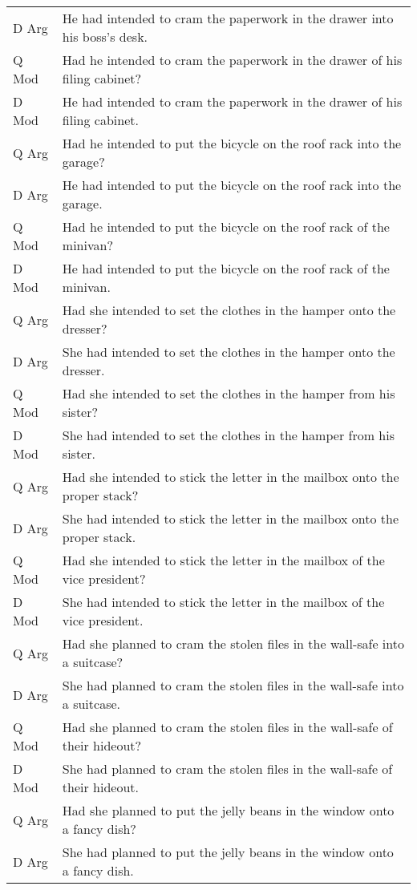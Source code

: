 \documentclass[11pt,oneside]{book}
\begin{document}
\begin{longtable}{ll}
D Arg & He had intended to cram the paperwork in the drawer into his boss's desk.\\
Q Mod & Had he intended to cram the paperwork in the drawer of his filing cabinet?\\
D Mod & He had intended to cram the paperwork in the drawer of his filing cabinet.\\
\addlinespace
Q Arg & Had he intended to put the bicycle on the roof rack into the garage?\\
D Arg & He had intended to put the bicycle on the roof rack into the garage.\\
Q Mod & Had he intended to put the bicycle on the roof rack of the minivan?\\
D Mod & He had intended to put the bicycle on the roof rack of the minivan.\\
\addlinespace
Q Arg & Had she intended to set the clothes in the hamper onto the dresser?\\
D Arg & She had intended to set the clothes in the hamper onto the dresser.\\
Q Mod & Had she intended to set the clothes in the hamper from his sister?\\
D Mod & She had intended to set the clothes in the hamper from his sister.\\
\addlinespace
Q Arg & Had she intended to stick the letter in the mailbox onto the proper stack?\\
D Arg & She had intended to stick the letter in the mailbox onto the proper stack.\\
Q Mod & Had she intended to stick the letter in the mailbox of the vice president?\\
D Mod & She had intended to stick the letter in the mailbox of the vice president.\\
\addlinespace
Q Arg & Had she planned to cram the stolen files in the wall-safe into a suitcase?\\
D Arg & She had planned to cram the stolen files in the wall-safe into a suitcase.\\
Q Mod & Had she planned to cram the stolen files in the wall-safe of their hideout?\\
D Mod & She had planned to cram the stolen files in the wall-safe of their hideout.\\
\addlinespace
Q Arg & Had she planned to put the jelly beans in the window onto a fancy dish?\\
D Arg & She had planned to put the jelly beans in the window onto a fancy dish.\\

\end{longtable}
\end{document}
